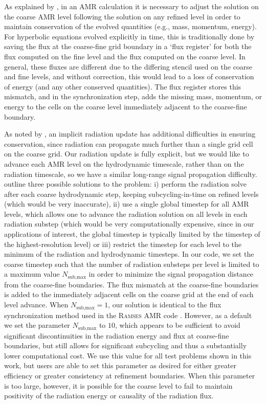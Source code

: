 \documentclass[fleqn,usenatbib]{mnras}
\begin{document}
As explained by \cite{Berger:1989}, in an AMR calculation it is necessary to adjust the solution on the coarse AMR level following the solution on any refined level in order to maintain conservation of the evolved quantities (e.g., mass, momentum, energy). For hyperbolic equations evolved explicitly in time, this is traditionally done by saving the flux at the coarse-fine grid boundary in a `flux register' for both the flux computed on the fine level and the flux computed on the coarse level. In general, these fluxes are different due to the differing stencil used on the coarse and fine levels, and without correction, this would lead to a loss of conservation of energy (and any other conserved quantities). The flux register stores this mismatch, and in the synchronization step, adds the missing mass, momentum, or energy to the cells on the coarse level immediately adjacent to the coarse-fine boundary.

As noted by \cite{Howell_2003}, an implicit radiation update has additional difficulties in ensuring conservation, since radiation can propagate much further than a single grid cell on the coarse grid. Our radiation update is fully explicit, but we would like to advance each AMR level on the hydrodynamic timescale, rather than on the radiation timescale, so we have a similar long-range signal propagation difficulty. \cite{Rosdahl_2013} outline three possible solutions to the problem: i) perform the radiation solve after each coarse hydrodynamic step, keeping subcycling-in-time on refined levels (which would be very inaccurate), ii) use a single global timestep for all AMR levels, which allows one to advance the radiation solution on all levels in each radiation substep (which would be very computationally expensive, since in our applications of interest, the global timestep is typically limited by the timestep of the highest-resolution level) or iii) restrict the timestep for each level to the minimum of the radiation and hydrodynamic timesteps. In our code, we set the coarse timestep such that the number of radiation substeps per level is limited to a maximum value $N_{\text{sub,max}}$ in order to minimize the signal propagation distance from the coarse-fine boundaries. The flux mismatch at the coarse-fine boundaries is added to the immediately adjacent cells on the coarse grid at the end of each level advance. When $N_{\text{sub,max}} = 1$, our solution is identical to the flux synchronization method used in the \textsc{Ramses} AMR code \citep{Rosdahl_2013}. However, as a default we set the parameter $N_{\text{sub,max}}$ to $10$, which appears to be sufficient to avoid significant discontinuities in the radiation energy and flux at coarse-fine boundaries, but still allows for significant subcycling and thus a substantially lower computational cost. We use this value for all test problems shown in this work, but users are able to set this parameter as desired for either greater efficiency or greater consistency at refinement boundaries. When this parameter is too large, however, it is possible for the coarse level to fail to maintain positivity of the radiation energy or causality of the radiation flux.
\end{document}

